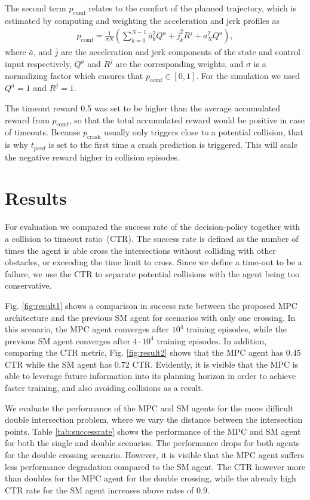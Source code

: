 The second term $p_\mathrm{comf}$ relates to the comfort of the planned trajectory, which is estimated by computing and weighting the acceleration and jerk profiles as
\begin{align*}
p_\mathrm{comf} = \frac{1}{\sigma{}N}(\sum_{k=0}^{N-1} \bar{a}_k^2Q^a + \bar{j}_k^2R^j + a_N^2Q^a),
\end{align*}
where $\bar{a}$, and $\bar{j}$ are the acceleration and jerk components of the state and control input respectively, $Q^a$ and $R^j$ are the corresponding weights, and $\sigma$ is a normalizing factor which ensures that $p_\mathrm{comf}\in[0,1]$. For the simulation we used $Q^a=1$ and  $R^j=1$.

The timeout reward 0.5 was set to be higher than the average accumulated reward from $p_\mathrm{comf}$, so that the total accumulated reward would be positive in case of timeouts. Because $p_{\text{crash}}$ usually only triggers close to a potential collision, that is why $t_{pred}$ is set to the first time a crash prediction is triggered. This will scale the negative reward higher in collision episodes. 

\section{Results}\label{sec:results}
For evaluation we compared the success rate of the decision-policy together with a collision to timeout ratio~(CTR). The success rate is defined as the number of times the agent is able cross the intersections without colliding with other obstacles, or exceeding the time limit to cross. Since we define a time-out to be a failure, we use the CTR to separate potential collisions with the agent being too conservative.

Fig. \ref{fig:result1} shows a comparison in success rate between the proposed MPC architecture and the previous SM agent for scenarios with only one crossing. In this scenario, the MPC agent converges after $10^4$ training episodes, while the previous SM agent converges after $4\cdot{}10^4$ training episodes. In addition, comparing the CTR metric, Fig. \ref{fig:result2} shows that the MPC agent has $0.45$ CTR while the SM agent has $0.72$ CTR. Evidently, it is visible that the MPC is able to leverage future information into its planning horizon in order to achieve faster training, and also avoiding collisions as a  result.

We evaluate the performance of the MPC and SM agents for the more difficult double intersection problem, where we vary the distance between the intersection points. Table \ref{tab:successrate} shows the performance of the MPC and SM agent for both the single and double scenarios. The performance drops for both agents for the double crossing scenario. However, it is visible that the MPC agent suffers less performance degradation compared to the SM agent. The CTR however more than doubles for the MPC agent for the double crossing, while the already high CTR rate for the SM agent increases above rates of $0.9$.

